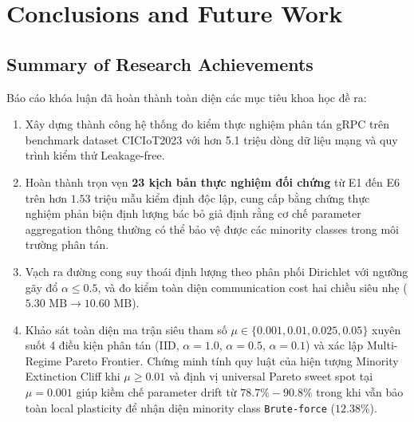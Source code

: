 \chapter{Conclusions and Future Work}
\label{chap:conclusions}

\section{Summary of Research Achievements}
\label{sec:concl_summary}
Báo cáo khóa luận đã hoàn thành toàn diện các mục tiêu khoa học đề ra:
\begin{enumerate}
    \item Xây dựng thành công hệ thống đo kiểm thực nghiệm phân tán gRPC trên benchmark dataset CICIoT2023 với hơn 5.1 triệu dòng dữ liệu mạng và quy trình kiểm thử Leakage-free.
    \item Hoàn thành trọn vẹn \textbf{23 kịch bản thực nghiệm đối chứng} từ E1 đến E6 trên hơn $1.53$ triệu mẫu kiểm định độc lập, cung cấp bằng chứng thực nghiệm phản biện định lượng bác bỏ giả định rằng cơ chế parameter aggregation thông thường có thể bảo vệ được các minority classes trong môi trường phân tán.
    \item Vạch ra đường cong suy thoái định lượng theo phân phối Dirichlet với ngưỡng gãy đổ $\alpha \le 0.5$, và đo kiểm toàn diện communication cost hai chiều siêu nhẹ ($5.30\text{ MB} \to 10.60\text{ MB}$).
    \item Khảo sát toàn diện ma trận siêu tham số $\mu \in \{0.001, 0.01, 0.025, 0.05\}$ xuyên suốt 4 điều kiện phân tán (IID, $\alpha=1.0$, $\alpha=0.5$, $\alpha=0.1$) và xác lập Multi-Regime Pareto Frontier. Chứng minh tính quy luật của hiện tượng Minority Extinction Cliff khi $\mu \ge 0.01$ và định vị universal Pareto sweet spot tại $\mu=0.001$ giúp kiềm chế parameter drift từ $78.7\% - 90.8\%$ trong khi vẫn bảo toàn local plasticity để nhận diện minority class \texttt{Brute-force} ($12.38\%$).
\end{enumerate}

